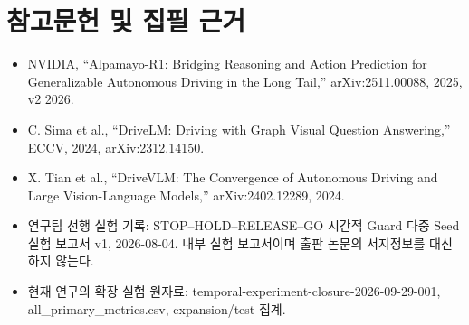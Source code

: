 \documentclass[11pt,a4paper]{article}
\begin{document}
\section*{참고문헌 및 집필 근거}
\begin{itemize}
\item [1] NVIDIA, “Alpamayo-R1: Bridging Reasoning and Action Prediction for Generalizable Autonomous Driving in the Long Tail,” arXiv:2511.00088, 2025, v2 2026.
\item [2] C. Sima et al., “DriveLM: Driving with Graph Visual Question Answering,” ECCV, 2024, arXiv:2312.14150.
\item [3] X. Tian et al., “DriveVLM: The Convergence of Autonomous Driving and Large Vision-Language Models,” arXiv:2402.12289, 2024.
\item [4] 연구팀 선행 실험 기록: STOP–HOLD–RELEASE–GO 시간적 Guard 다중 Seed 실험 보고서 v1, 2026-08-04. 내부 실험 보고서이며 출판 논문의 서지정보를 대신하지 않는다.
\item [5] 현재 연구의 확장 실험 원자료: temporal-experiment-closure-2026-09-29-001, all\_\allowbreak{}primary\_\allowbreak{}metrics.csv, expansion/test 집계.
\end{itemize}
\end{document}
